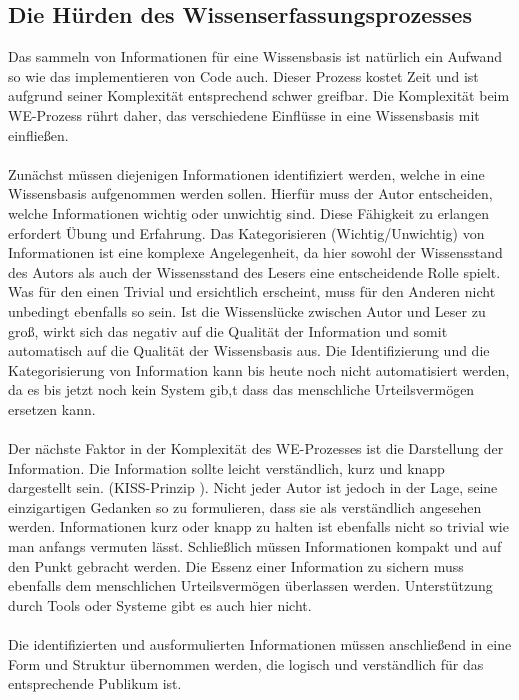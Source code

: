 \documentclass[a4paper,12pt,twoside]{scrartcl}
\begin{document}
\subsection{Die Hürden des Wissenserfassungsprozesses}
Das sammeln von Informationen für eine Wissensbasis ist natürlich ein Aufwand so wie das implementieren von Code auch. Dieser Prozess kostet Zeit und ist aufgrund seiner Komplexität entsprechend schwer greifbar. Die Komplexität beim WE-Prozess rührt daher, das verschiedene Einflüsse in eine Wissensbasis mit einfließen.
\\\\
Zunächst müssen diejenigen Informationen identifiziert werden, welche in eine Wissensbasis aufgenommen werden sollen. Hierfür muss der Autor entscheiden, welche Informationen wichtig oder unwichtig sind. Diese Fähigkeit zu erlangen erfordert Übung und Erfahrung. Das Kategorisieren (Wichtig/Unwichtig) von Informationen ist eine komplexe Angelegenheit, da hier sowohl der Wissensstand des Autors als auch der Wissensstand des Lesers eine entscheidende Rolle spielt. Was für den einen Trivial und ersichtlich erscheint, muss für den Anderen nicht unbedingt ebenfalls so sein. Ist die Wissenslücke zwischen Autor und Leser zu groß, wirkt sich das negativ auf die Qualität der Information und somit automatisch auf die Qualität der Wissensbasis aus. Die Identifizierung und die Kategorisierung von Information kann bis heute noch nicht automatisiert werden, da es bis jetzt noch kein System gib,t dass das menschliche Urteilsvermögen ersetzen kann.
\\\\
Der nächste Faktor in der Komplexität des WE-Prozesses ist die Darstellung der Information. Die Information sollte leicht verständlich, kurz und knapp dargestellt sein. (KISS-Prinzip\footnotemark
). Nicht jeder Autor ist jedoch in der Lage, seine einzigartigen Gedanken so zu formulieren, dass sie als verständlich angesehen werden. Informationen kurz oder knapp zu halten ist ebenfalls nicht so trivial wie man anfangs vermuten lässt. Schließlich müssen Informationen kompakt und auf den Punkt gebracht werden. Die Essenz einer Information zu sichern muss ebenfalls dem menschlichen Urteilsvermögen überlassen werden. Unterstützung durch Tools oder Systeme gibt es auch hier nicht.
\\\\
Die identifizierten und ausformulierten Informationen müssen anschließend in eine Form und Struktur übernommen werden, die logisch und verständlich für das entsprechende Publikum ist. 
\end{document}

